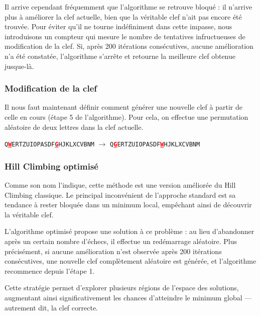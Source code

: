 \documentclass[a4paper]{article}
\newcommand{\highlight}[1]{\textbf{\textcolor{red}{\underline{#1}}}}
\begin{document}
Il arrive cependant fréquemment que l’algorithme se retrouve bloqué : il n’arrive plus à améliorer la clef actuelle, bien que la véritable clef n’ait pas encore été trouvée.  
Pour éviter qu’il ne tourne indéfiniment dans cette impasse, nous introduisons un compteur qui mesure le nombre de tentatives infructueuses de modification de la clef.  
Si, après 200 itérations consécutives, aucune amélioration n’a été constatée, l’algorithme s’arrête et retourne la meilleure clef obtenue jusque-là.

\subsubsection*{Modification de la clef}\label{sec:modification_de_la_clef}

Il nous faut maintenant définir comment générer une nouvelle clef à partir de celle en cours (étape 5 de l’algorithme).  
Pour cela, on effectue une permutation aléatoire de deux lettres dans la clef actuelle.

\begin{center}
\texttt{Q\highlight{W}ERTZUIOPASDF\highlight{G}HJKLXCVBNM} $\rightarrow$ \texttt{Q\highlight{G}ERTZUIOPASDF\highlight{W}HJKLXCVBNM}
\end{center}


\subsubsection{Hill Climbing optimisé}

Comme son nom l’indique, cette méthode est une version améliorée du Hill Climbing classique.  
Le principal inconvénient de l’approche standard est sa tendance à rester bloquée dans un minimum local, empêchant ainsi de découvrir la véritable clef.

L’algorithme optimisé propose une solution à ce problème : au lieu d’abandonner après un certain nombre d’échecs, il effectue un redémarrage aléatoire.  
Plus précisément, si aucune amélioration n’est observée après 200 itérations consécutives, une nouvelle clef complètement aléatoire est générée, et l’algorithme recommence depuis l’étape 1.

Cette stratégie permet d’explorer plusieurs régions de l’espace des solutions, augmentant ainsi significativement les chances d’atteindre le minimum global — autrement dit, la clef correcte.
\end{document}
